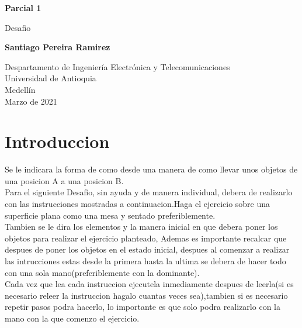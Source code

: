 \documentclass{article}
\begin{document}
\begin{titlepage}
    \begin{center}
        \vspace*{1cm}
            
        \Huge
        \textbf{Parcial 1 }
            
        \vspace{0.5cm}
        \LARGE
        Desafio
            
        \vspace{1.5cm}
            
        \textbf{Santiago Pereira Ramirez}
            
        \vfill
            
        \vspace{0.8cm}
            
        \Large
        Despartamento de Ingeniería Electrónica y Telecomunicaciones\\
        Universidad de Antioquia\\
        Medellín\\
        Marzo de 2021
            
    \end{center}
\end{titlepage}

\tableofcontents
\newpage
\section{Introduccion }\label{intro}
Se le indicara la forma de como desde una manera de como llevar unos objetos de una posicion  A a una posicion B.\\


Para el siguiente Desafio, sin ayuda y de manera individual, debera de realizarlo con las instrucciones mostradas a continuacion.Haga el ejercicio sobre una superficie plana como una mesa y sentado preferiblemente.\\

Tambien se le dira los elementos y la manera inicial en que debera poner los objetos para realizar el ejercicio planteado, Ademas es importante recalcar que despues de poner los objetos en el estado inicial, despues al comenzar a realizar las intrucciones estas desde la primera hasta la ultima se debera de hacer todo con una sola mano(preferiblemente con la dominante).\\


Cada vez que lea cada instruccion ejecutela inmediamente despues de leerla(si es necesario releer la instruccion hagalo cuantas veces sea),tambien si es necesario repetir pasos podra hacerlo, lo importante es que solo podra realizarlo con la mano con la que comenzo el ejercicio.\\
\end{document}
